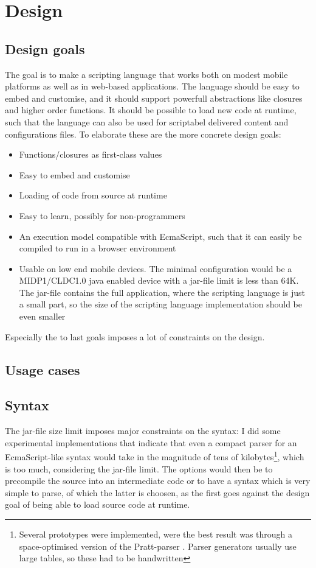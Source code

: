 \chapter{Design}
\section{Design goals}

The goal is to make a scripting language that works both on modest mobile platforms as well as in web-based applications.
The language should be easy to embed and customise, and it should support powerfull abstractions like closures and higher order functions.
It should be possible to load new code at runtime, such that the language can also be used for scriptabel delivered content and configurations files.
To elaborate these are the more concrete design goals:
\begin{itemize}
\item Functions/closures as first-class values
\item Easy to embed and customise
\item Loading of code from source at runtime
\item Easy to learn, possibly for non-programmers
\item An execution model compatible with EcmaScript, such that it can easily be compiled to run in a browser environment
\item Usable on low end mobile devices. The minimal configuration would be a MIDP1/CLDC1.0 java enabled device with a jar-file limit is less than 64K. The jar-file contains the full application, where the scripting language is just a small part, so the size of the scripting language implementation should be even smaller
\end{itemize}
Especially the to last goals imposes a lot of constraints on the design.

\section{Usage cases}

\section{Syntax}
The jar-file size limit imposes major constraints on the syntax: I did some experimental implementations that indicate that even a compact parser for an EcmaScript-like syntax would take in the magnitude of tens of kilobytes\footnote{Several prototypes were implemented, were the best result was through a space-optimised version of the Pratt-parser \cite{pratt, beautiful-code}. Parser generators usually use large tables, so these had to be handwritten}, which is too much, considering the jar-file limit. 
The options would then be to precompile the source into an intermediate code or to have a syntax which is very simple to parse, of which the latter is choosen, as the first goes against the design goal of being able to load source code at runtime. 

